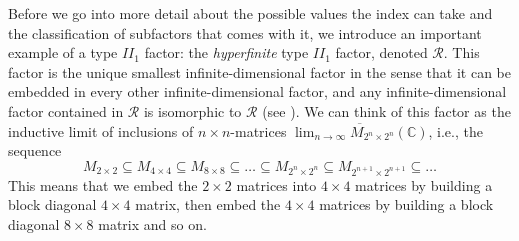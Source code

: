 Before we go into more detail about the possible values the index can take and the classification of subfactors that comes with it, we introduce an important example of a type $II_1$ factor: the \emph{hyperfinite} type $II_1$ factor, denoted $\mathcal{R}$. This factor is the unique smallest infinite-dimensional factor in the sense that it can be embedded in every other infinite-dimensional factor, and any infinite-dimensional factor contained in $\mathcal{R}$ is isomorphic to $\mathcal{R}$ (see \cite{Connes1976}). We can think of this factor as the inductive limit of inclusions of $n\times n$-matrices $\overline{\lim_{n\to\infty}M_{2^n\times2^n}(\mathbb{C})}$, i.e., the sequence
	\begin{equation}
		M_{2\times 2}\subseteq M_{4\times 4}\subseteq M_{8\times 8}\subseteq\dots\subseteq M_{2^n\times 2^n}\subseteq M_{2^{n+1}\times 2^{n+1}}\subseteq\dots
	\end{equation}
This means that we embed the $2\times 2$ matrices into $4\times 4$ matrices by building a block diagonal $4\times 4$ matrix, then embed the $4\times 4$ matrices by building a block diagonal $8\times 8$ matrix and so on. 

